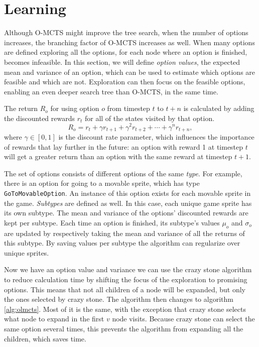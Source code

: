 \section{Learning}
\label{sec:learning}
Although O-MCTS might improve the tree search, when the number of options
increases, the branching factor of O-MCTS increases as well. When many options
are defined exploring all the options, for each node where an option is
finished, becomes infeasible. In this section, we will define \emph{option
values}, the expected mean and variance of an option, which can be used to
estimate which options are feasible and which are not. Exploration can then
focus on the feasible options, enabling an even deeper search tree than O-MCTS,
in the same time.

The return $R_o$ for using option $o$ from timestep $t$ to $t+n$ is calculated
by adding the discounted rewards $r_t$ for all of the states visited by that
option.  $$R_o = r_{t} + \gamma r_{t+1} + \gamma^2 r_{t+2} + \cdots + \gamma^n
r_{t+n},$$ where $\gamma \in [0, 1]$ is the discount rate parameter, which
influences the importance of rewards that lay further in the future: an option
with reward 1 at timestep $t$ will get a greater return than an option with the
same reward at timestep $t+1$.  

The set of options consists of different options of the same \emph{type}. For example,
there is an option for going to a movable sprite, which has type
\texttt{GoToMovableOption}. An instance of this option exists for each movable
sprite in the game. \emph{Subtypes} are defined as well. In this case, each
unique game sprite has its own subtype. The mean and variance of the options'
discounted rewards are kept per subtype. Each time an option is finished, its
subtype's values $\mu_o$ and $\sigma_o$ are updated by respectively taking the
mean and variance of all the returns of this subtype. By saving values per
subtype the algorithm can regularize over unique sprites.

Now we have an option value and variance we can use the crazy stone algorithm
to reduce calculation time by shifting the focus of the exploration to promising
options. This means that not all children of a node will be expanded, but only
the ones selected by crazy stone. The algorithm then changes to algorithm
\ref{alg:olmcts}. Most of it is the same, with the exception that crazy stone
selects what node to expand in the first $v$ node visits. Because crazy stone
can select the same option several times, this prevents the algorithm from
expanding all the children, which saves time. 

